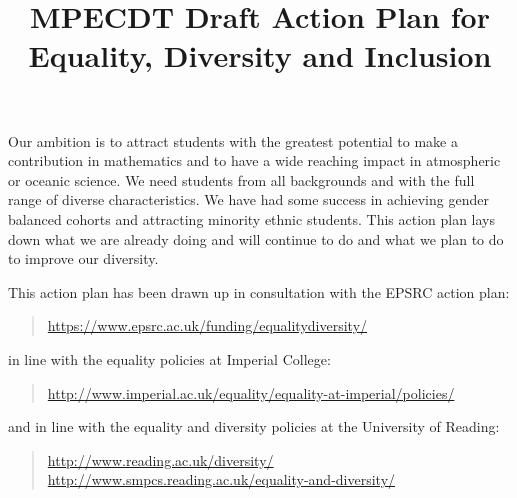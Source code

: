 \documentclass[12pt]{article}
\begin{document}
\title{MPECDT Draft Action Plan for Equality, Diversity and Inclusion}
\maketitle

\noindent
Our ambition is to attract students with the greatest potential to make a contribution in mathematics and to have a wide reaching impact in atmospheric or oceanic science. We need students from all backgrounds and with the full range of diverse characteristics. We have had some success in achieving gender balanced cohorts and attracting minority ethnic students. This action plan lays down what we are already doing and will continue to do and what we plan to do to improve our diversity.

This action plan has been drawn up in consultation with the EPSRC action plan:
\begin{quote}
\url{https://www.epsrc.ac.uk/funding/equalitydiversity/}
\end{quote}
in line with the equality policies at Imperial College:
\begin{quote}
\url{http://www.imperial.ac.uk/equality/equality-at-imperial/policies/}
\end{quote}
and in line with the equality and diversity policies at the University of Reading:
\begin{quote}
\url{http://www.reading.ac.uk/diversity/} \\
\url{http://www.smpcs.reading.ac.uk/equality-and-diversity/}
\end{quote}
\end{document}
